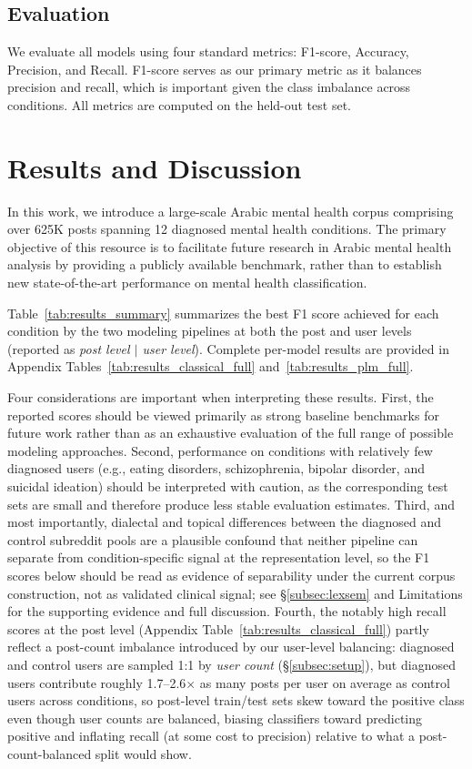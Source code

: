 \documentclass[letterpaper]{article} %
\begin{document}
\subsection{Evaluation}
\label{subsec:eval}

We evaluate all models using four standard metrics: F1-score, Accuracy, Precision, and Recall. F1-score serves as our primary metric as it balances precision and recall, which is important given the class imbalance across conditions. All metrics are computed on the held-out test set.


\section{Results and Discussion}
\label{sec:results}
In this work, we introduce a large-scale Arabic mental health corpus comprising over 625K posts spanning 12 diagnosed mental health conditions. The primary objective of this resource is to facilitate future research in Arabic mental health analysis by providing a publicly available benchmark, rather than to establish new state-of-the-art performance on mental health classification.

Table~\ref{tab:results_summary} summarizes the best F1 score achieved for each condition by the two modeling pipelines at both the post and user levels (reported as \textit{post level $|$ user level}). Complete per-model results are provided in Appendix Tables~\ref{tab:results_classical_full} and~\ref{tab:results_plm_full}.

Four considerations are important when interpreting these results. First, the reported scores should be viewed primarily as strong baseline benchmarks for future work rather than as an exhaustive evaluation of the full range of possible modeling approaches. Second, performance on conditions with relatively few diagnosed users (e.g., eating disorders, schizophrenia, bipolar disorder, and suicidal ideation) should be interpreted with caution, as the corresponding test sets are small and therefore produce less stable evaluation estimates. Third, and most importantly, dialectal and topical differences between the diagnosed and control subreddit pools are a plausible confound that neither pipeline can separate from condition-specific signal at the representation level, so the F1 scores below should be read as evidence of separability under the current corpus construction, not as validated clinical signal; see §\ref{subsec:lexsem} and Limitations for the supporting evidence and full discussion. Fourth, the notably high recall scores at the post level (Appendix Table~\ref{tab:results_classical_full}) partly reflect a post-count imbalance introduced by our user-level balancing: diagnosed and control users are sampled 1:1 by \textit{user count} (\S\ref{subsec:setup}), but diagnosed users contribute roughly 1.7--2.6$\times$ as many posts per user on average as control users across conditions, so post-level train/test sets skew toward the positive class even though user counts are balanced, biasing classifiers toward predicting positive and inflating recall (at some cost to precision) relative to what a post-count-balanced split would show.
\end{document}
